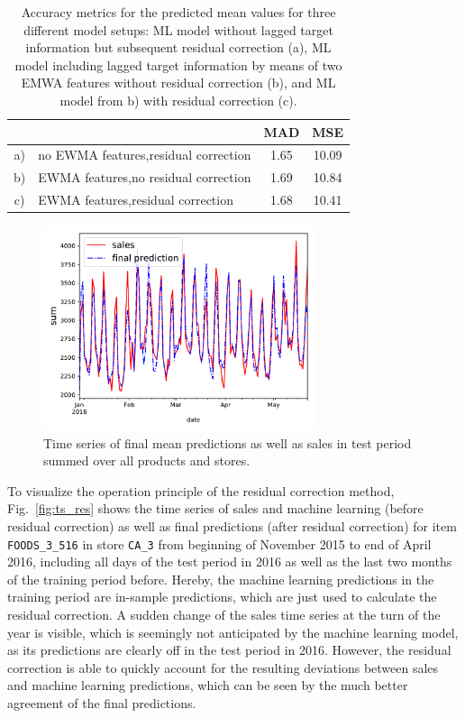 \documentclass[BCOR=1mm, DIV=calc,10pt,
twoside=true,
twocolumn,
headings=normal]{scrartcl}
\newcommand{\fig}{Fig.~}
\begin{document}
\begin{table}[h!]
\begin{center}
\caption{Accuracy metrics for the predicted mean values for three different model setups: ML model without lagged target information but subsequent residual correction (a), ML model including lagged target information by means of two EMWA features without residual correction (b), and ML model from b) with residual correction (c).}
\label{tab:mad_mse}
\begin{tabular}{c|p{4cm}|c|c}
 & & \textbf{MAD} & \textbf{MSE} \\
\hline
a) & no EWMA features,\newline residual correction & 1.65 & 10.09 \\
\hline
b) & EWMA features,\newline no residual correction & 1.69 & 10.84 \\
\hline
c) & EWMA features,\newline residual correction & 1.68 & 10.41
\end{tabular}
\end{center}
\end{table}

\begin{figure}
\begin{center}
\includegraphics[width=8cm]{figs/ts_full}
\caption{\label{fig:mean_prediction} Time series of final mean predictions as well as sales in test period summed over all products and stores.}
\end{center}
\end{figure}

To visualize the operation principle of the residual correction method, \fig \ref{fig:ts_res} shows the time series of sales and machine learning (before residual correction) as well as final predictions (after residual correction) for item \texttt{FOODS\_3\_516} in store \texttt{CA\_3} from beginning of November 2015 to end of April 2016, including all days of the test period in 2016 as well as the last two months of the training period before. Hereby, the machine learning predictions in the training period are in-sample predictions, which are just used to calculate the residual correction. A sudden change of the sales time series at the turn of the year is visible, which is seemingly not anticipated by the machine learning model, as its predictions are clearly off in the test period in 2016. However, the residual correction is able to quickly account for the resulting deviations between sales and machine learning predictions, which can be seen by the much better agreement of the final predictions.
\end{document}
